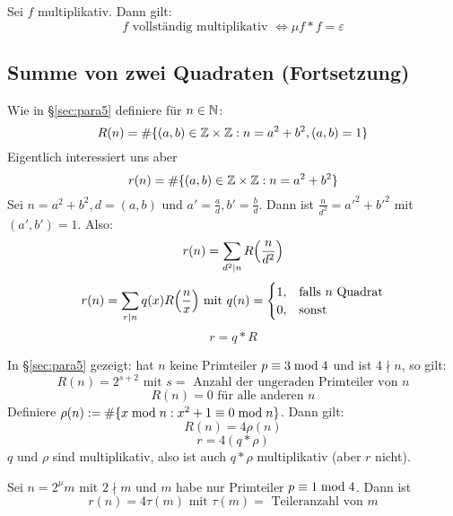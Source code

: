 \begin{falko} \label{F8.6}
	Sei $f$ multiplikativ. Dann gilt:
	\[ f \text{ vollständig multiplikativ } \Leftrightarrow \mu f * f = \varepsilon \]
\end{falko}

\subsection{Summe von zwei Quadraten (Fortsetzung)}
Wie in §\ref{sec:para5} definiere für $n \in \mathbb{N}$: 
\[ R(n) = \#\{(a,b) \in \mathbb{Z} \times \mathbb{Z} : n=a^2+b^2, (a,b) = 1\} \]
Eigentlich interessiert uns aber
\[ r(n) = \#\{(a,b) \in \mathbb{Z} \times \mathbb{Z} : n=a^2+b^2\} \]
Sei $n = a^2+b^2, d = (a,b)$ und $a' = \frac{a}{d}, b' = \frac{b}{d}$. Dann ist $\frac{n}{d^2} = a'^2+b'^2$ mit $(a',b')=1$. Also:
\begin{equation}
	r(n) = \sum\limits_{d^2 \mid n} R\enbrace*{\frac{n}{d^2}} \label{eq_8_1}
\end{equation}
\begin{equation}
	r(n) = \sum\limits_{r \mid n} q(x) R\enbrace*{\frac{n}{x}} \text{ mit } q(n) = \begin{cases}
		1, & \text{falls } n \text{ Quadrat} \\
		0, & \text{sonst}
	\end{cases} \label{eq_8_2}
\end{equation}
\begin{equation}
	r = q * R \label{eq_8_2'}
\end{equation}

In §\ref{sec:para5} gezeigt: hat $n$ keine Primteiler $p \equiv 3 \bmod 4$ und ist $4 \nmid n$, so gilt:
\[ R(n) = 2^{s+2} \text{ mit } s = \text{ Anzahl der ungeraden Primteiler von } n \]
\[ R(n) = 0 \text{ für alle anderen } n \] 
Definiere $\rho(n) := \# \{x \bmod n : x^2+1 \equiv 0 \bmod n \}$. Dann gilt:
\begin{equation}
	R(n) = 4 \rho(n) \label{eq_8_3}
\end{equation}
\begin{equation}
	r = 4(q * \rho) \label{eq_8_3'}
\end{equation}
$q$ und $\rho$ sind multiplikativ, also ist auch $q * \rho $ multiplikativ (aber $r$ nicht).

\begin{falko} \label{F8.7}
	Sei $n = 2^\mu m$ mit $2 \nmid m$ und $m$ habe nur Primteiler $p \equiv 1 \bmod 4$. Dann ist
	\[ r(n) = 4 \tau(m) \text{ mit } \tau(m) = \text{ Teileranzahl von } m \]
\end{falko}

